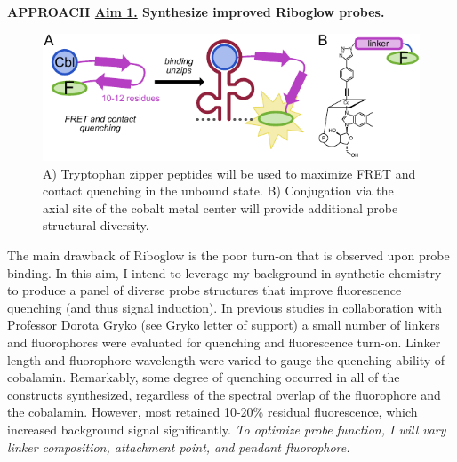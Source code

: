 \textbf{APPROACH \underline{Aim 1.} Synthesize improved Riboglow probes.}\\
\begin{figure}
\begin{centering}
\includegraphics[width=\textwidth]{figures/aim1v3.pdf}

\end{centering}
\footnotesize
\caption{\label{figure:aim1}
A) Tryptophan zipper peptides will be used to maximize FRET and contact quenching in the unbound state. B) Conjugation via the axial site of the cobalt metal center will provide additional probe structural diversity.
}
\end{figure}
The main drawback of Riboglow is the poor turn-on that is observed upon probe binding. In this aim, I intend to leverage my background in synthetic chemistry to produce a panel of diverse probe structures that improve fluorescence quenching (and thus signal induction). In previous studies in collaboration with Professor Dorota Gryko (see Gryko letter of support) a small number of linkers and fluorophores were evaluated for quenching and fluorescence turn-on. Linker length and fluorophore wavelength were varied to gauge the quenching ability of cobalamin. Remarkably, some degree of quenching occurred in all of the constructs synthesized, regardless of the spectral overlap of the fluorophore and the cobalamin. However, most retained 10-20\% residual fluorescence, which increased background signal significantly. \textit{To optimize probe function, I will vary linker composition, attachment point, and pendant fluorophore.}

